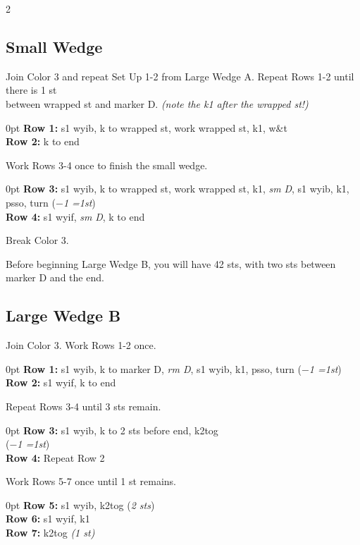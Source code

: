\documentclass[12pt]{article}
\newcommand{\rowDir}[1]{\textbf{#1:}} %
\newcommand{\decrease}[1]{(\emph{$-$#1
	\ifnum#1=1{st}\else{sts}\fi})}
\newcommand{\stitchcount}[1]{(\emph{#1 sts})}
\newcommand{\sm}{\emph{sm}} %
\renewcommand{\rm}[1]{\emph{rm #1}} %
\newenvironment{unframed}
    {%
\begin{addmargin}[2em]{0pt}
	\setlength{\parindent}{-2em}}
    {\setlength{\parindent}{0em}
	\end{addmargin}}
\begin{document}
\begin{multicols}{2}
\subsection*{Small Wedge}

Join Color 3 and repeat Set Up 1-2 from Large Wedge A. Repeat Rows 1-2 until there is 1 st \\ between wrapped st and marker D. \emph{(note the k1 after the wrapped st!)}
\begin{unframed}
\rowDir{Row 1} s1 wyib, k to wrapped st, work wrapped st, k1, w\&t \\
\rowDir{Row 2} k to end \end{unframed}
Work Rows 3-4 once to finish the small wedge. 
\begin{unframed}
\rowDir{Row 3} s1 wyib, k to wrapped st, work wrapped st, k1, \sm{} \emph{D}, s1 wyib, k1, psso, turn \decrease{1} \\
\rowDir{Row 4} s1 wyif, \sm{} \emph{D}, k to end 
\end{unframed}
Break Color 3.

\vspace{1em}
Before beginning Large Wedge B, you will have 42 sts, with two sts between marker D and the end.

\subsection*{Large Wedge B}

Join Color 3. Work Rows 1-2 once.

\begin{unframed}
\rowDir{Row 1} s1 wyib, k to marker D, \rm{D}, s1 wyib, k1, psso, turn \decrease{1} \\
\rowDir{Row 2} s1 wyif, k to end
\end{unframed}

Repeat Rows 3-4 until 3 sts remain.

\begin{unframed}
\rowDir{Row 3} s1 wyib, k to 2 sts before end, k2tog \\ \decrease{1} \\
\rowDir{Row 4} Repeat Row 2
\end{unframed}

Work Rows 5-7 once until 1 st remains.

\begin{unframed}
\rowDir{Row 5} s1 wyib, k2tog \stitchcount{2} \\
\rowDir{Row 6} s1 wyif, k1 \\
\rowDir{Row 7} k2tog \emph{(1 st)}
\end{unframed}


\end{multicols}
\end{document}
